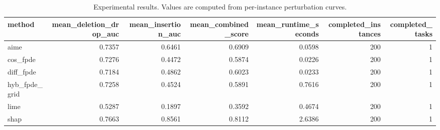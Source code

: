 \begin{table}[t]
\caption{Experimental results. Values are computed from per-instance perturbation curves.}
\label{tab:main_results_computed}
\centering
\begin{tabular}{lrrrrrr}
\toprule
method & mean\_deletion\_drop\_auc & mean\_insertion\_auc & mean\_combined\_score & mean\_runtime\_seconds & completed\_instances & completed\_tasks \\
\midrule
aime & 0.7357 & 0.6461 & 0.6909 & 0.0598 & 200 & 1 \\
cos\_fpde & 0.7276 & 0.4472 & 0.5874 & 0.0226 & 200 & 1 \\
diff\_fpde & 0.7184 & 0.4862 & 0.6023 & 0.0233 & 200 & 1 \\
hyb\_fpde\_grid & 0.7258 & 0.4524 & 0.5891 & 0.7616 & 200 & 1 \\
lime & 0.5287 & 0.1897 & 0.3592 & 0.4674 & 200 & 1 \\
shap & 0.7663 & 0.8561 & 0.8112 & 2.6386 & 200 & 1 \\
\bottomrule
\end{tabular}

\end{table}
